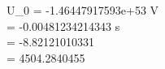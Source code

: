 U_0 = -1.46447917593e+53 V\\ \tau = -0.00481234214343 \si{\second}\\ \varphi = -8.82121010331\\ \omega = 4504.2840455